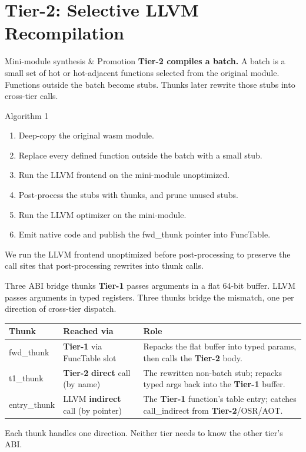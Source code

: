 \documentclass[aspectratio=169,11pt]{beamer}
\newcommand{\tone}{\textbf{\textcolor{tier1}{Tier-1}}}
\newcommand{\ttwo}{\textbf{\textcolor{tier2}{Tier-2}}}
\newcommand{\code}[1]{{\ttfamily\small #1}}
\begin{document}
\section{Tier-2: Selective LLVM Recompilation}
\begin{frame}{Mini-module synthesis \& Promotion}
  \small
  \textbf{Tier-2 compiles a batch.}
  A batch is a small set of hot or hot-adjacent functions selected from the original module.
  Functions outside the batch become stubs. Thunks later rewrite those stubs into cross-tier calls.
  \vspace{0.3em}
  \begin{block}{Algorithm 1}
    \begin{enumerate}\setlength{\itemsep}{1pt}
      \item Deep-copy the original wasm module.
      \item Replace every defined function outside the batch with a small stub.
      \item Run the LLVM frontend on the mini-module unoptimized.
      \item Post-process the stubs with thunks, and prune unused stubs.
      \item Run the LLVM optimizer on the mini-module.
      \item Emit native code and publish the \code{fwd\_thunk} pointer into \code{FuncTable}.
    \end{enumerate}
  \end{block}

  We run the LLVM frontend unoptimized before post-processing to preserve the call sites that post-processing rewrites into thunk calls.
\end{frame}

\begin{frame}{Three ABI bridge thunks}
  \tone{} passes arguments in a flat 64-bit buffer.
  LLVM passes arguments in typed registers.
  Three thunks bridge the mismatch, one per direction of cross-tier dispatch.
  
  \vspace{0.3em}
  \small
  \setlength{\tabcolsep}{4pt}
  \begin{tabular}{@{}p{2.0cm} p{3.4cm} p{6.0cm}@{}}
    \toprule
    Thunk & Reached via & Role \\
    \midrule
    \code{fwd\_thunk} & \tone{} via \code{FuncTable} slot &
      Repacks the flat buffer into typed params, then calls the \ttwo{} body. \\[2pt]
    \code{t1\_thunk} & \ttwo{} \textbf{direct} call (by name) &
      The rewritten non-batch stub; repacks typed args back into the \tone{} buffer. \\[2pt]
    \code{entry\_thunk} & LLVM \textbf{indirect} call (by pointer) &
      The \tone{} function's table entry; catches \code{call\_indirect} from \ttwo{}/OSR/AOT. \\
    \bottomrule
  \end{tabular}

  Each thunk handles one direction. Neither tier needs to know the other tier's ABI.
\end{frame}
\end{document}
